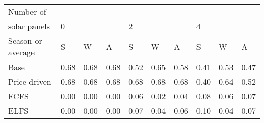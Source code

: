 \begin{table}[h] 
\centering 
\begin{tabular}{l|lll|lll|lll}Number of \\ solar panels&0& & &2& & &4& & \\ \hline 
Season or average & S & W & A & S & W & A & S & W & A \\ \hline 
Base&0.68&0.68&0.68&0.52&0.65&0.58&0.41&0.53&0.47 \\ 
Price driven&0.68&0.68&0.68&0.68&0.68&0.68&0.40&0.64&0.52 \\ 
FCFS&0.00&0.00&0.00&0.06&0.02&0.04&0.08&0.06&0.07 \\ 
ELFS&0.00&0.00&0.00&0.07&0.04&0.06&0.10&0.04&0.07 \\ 
\end{tabular} 
\end{table}